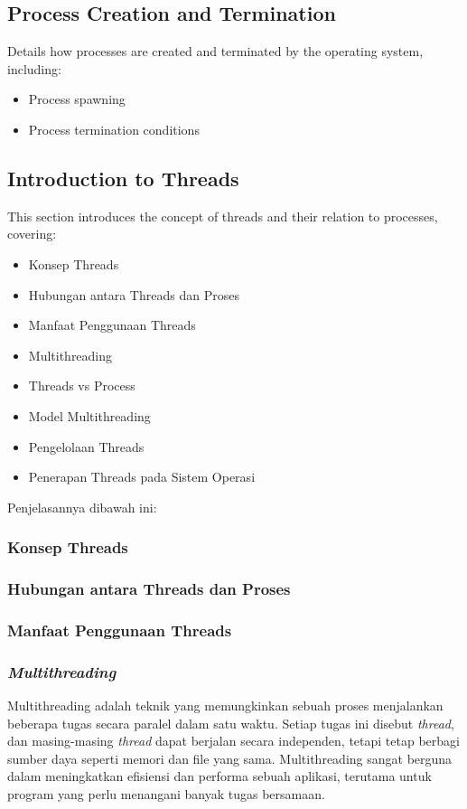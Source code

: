 \documentclass[12pt]{article}
\begin{document}
\subsection{Process Creation and Termination}
Details how processes are created and terminated by the operating system, including:
\begin{itemize}
    \item Process spawning
    \item Process termination conditions
\end{itemize}

\subsection{Introduction to Threads}
This section introduces the concept of threads and their relation to processes, covering:
\begin{itemize}
    \item Konsep Threads
    \item Hubungan antara Threads dan Proses
    \item Manfaat Penggunaan Threads
    \item Multithreading
    \item Threads vs Process
    \item Model Multithreading
    \item Pengelolaan Threads
    \item Penerapan Threads pada Sistem Operasi
\end{itemize}
Penjelasannya dibawah ini:
\subsubsection{Konsep Threads}
\subsubsection{Hubungan antara Threads dan Proses}
\subsubsection{Manfaat Penggunaan Threads}
\subsubsection{\textit{Multithreading}}
Multithreading adalah teknik yang memungkinkan sebuah proses menjalankan beberapa tugas secara paralel dalam satu waktu. Setiap tugas ini disebut \textit{thread}, dan masing-masing \textit{thread} dapat berjalan secara independen, tetapi tetap berbagi sumber daya seperti memori dan file yang sama. Multithreading sangat berguna dalam meningkatkan efisiensi dan performa sebuah aplikasi, terutama untuk program yang perlu menangani banyak tugas bersamaan.
\end{document}
